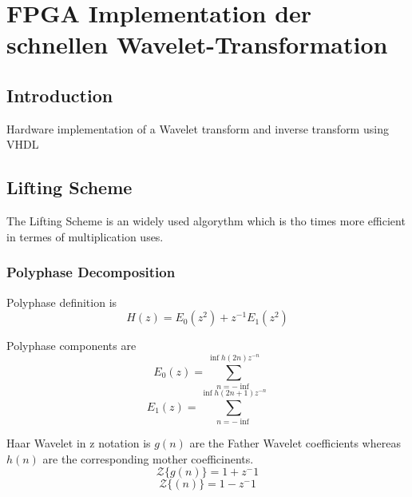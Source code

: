 %
%
%
\chapter{FPGA Implementation der schnellen Wavelet-Transformation\label{chapter:fpga}}
\begin{refsection}

\section{Introduction}

Hardware implementation of a Wavelet transform and inverse transform using VHDL


\section{Lifting Scheme}

The Lifting Scheme is an widely used algorythm which is tho times more efficient in termes of multiplication uses. 


\subsection{Polyphase Decomposition}


Polyphase definition is
\begin{equation}
H(z)=E_{0}(z^2)+z^{-1} E_1(z^2)
\end{equation}

Polyphase components are
\begin{equation}
E_0(z) = \sum_{n=-\inf}^{\inf h(2n)z^{-n}}
\end{equation}
\begin{equation}
E_1(z) = \sum_{n=-\inf}^{\inf h(2n+1)z^{-n}}
\end{equation}

Haar Wavelet in z notation is
$g(n)$ are the Father Wavelet coefficients whereas $h(n)$ are the corresponding mother coefficinents. 
\begin{equation}
{\mathcal {Z}} \{g(n)\} = 1 + z^-1
\end{equation}
\begin{equation}
{\mathcal {Z}} \{(n)\} = 1 - z^-1
\end{equation}



\end{refsection}
